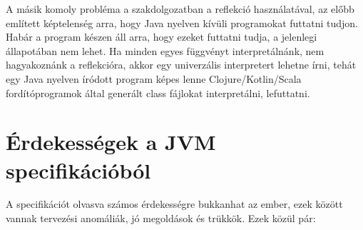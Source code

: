 A másik komoly probléma a szakdolgozatban a reflekció használatával, az előbb említett képtelenség arra, hogy Java nyelven kívüli programokat futtatni tudjon. Habár a program készen áll arra, hogy ezeket futtatni tudja, a jelenlegi állapotában nem lehet. Ha minden egyes függvényt interpretálnánk, nem hagyakoznánk a reflekcióra, akkor egy univerzális interpretert lehetne írni, tehát egy Java nyelven íródott program képes lenne Clojure/Kotlin/Scala fordítóprogramok által generált class fájlokat interpretálni, lefuttatni.

\section{Érdekességek a JVM specifikációból}

A specifikációt olvasva számos érdekességre bukkanhat az ember, ezek között vannak tervezési anomáliák, jó megoldások és trükkök. Ezek közül pár:

